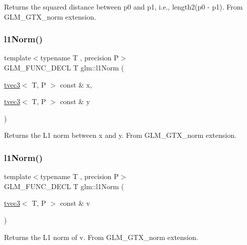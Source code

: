 Returns the squared distance between p0 and p1, i.\+e., length2(p0 -\/ p1). From G\+L\+M\+\_\+\+G\+T\+X\+\_\+norm extension. \mbox{\label{group__gtx__norm_gaebe5a39b06e262e615622129f37da4f4}} 
\subsubsection{\texorpdfstring{l1\+Norm()}{l1Norm()}\hspace{0.1cm}{\footnotesize\ttfamily [1/2]}}
{\footnotesize\ttfamily template$<$typename T , precision P$>$ \\
G\+L\+M\+\_\+\+F\+U\+N\+C\+\_\+\+D\+E\+CL T glm\+::l1\+Norm (\begin{DoxyParamCaption}\item[{\hyperlink{structglm_1_1tvec3}{tvec3}$<$ T, P $>$ const \&}]{x,  }\item[{\hyperlink{structglm_1_1tvec3}{tvec3}$<$ T, P $>$ const \&}]{y }\end{DoxyParamCaption})}

Returns the L1 norm between x and y. From G\+L\+M\+\_\+\+G\+T\+X\+\_\+norm extension. \mbox{\label{group__gtx__norm_ga6d5964f09cdb43803496a5ee3ced71cb}} 
\subsubsection{\texorpdfstring{l1\+Norm()}{l1Norm()}\hspace{0.1cm}{\footnotesize\ttfamily [2/2]}}
{\footnotesize\ttfamily template$<$typename T , precision P$>$ \\
G\+L\+M\+\_\+\+F\+U\+N\+C\+\_\+\+D\+E\+CL T glm\+::l1\+Norm (\begin{DoxyParamCaption}\item[{\hyperlink{structglm_1_1tvec3}{tvec3}$<$ T, P $>$ const \&}]{v }\end{DoxyParamCaption})}

Returns the L1 norm of v. From G\+L\+M\+\_\+\+G\+T\+X\+\_\+norm extension. \mbox{\label{group__gtx__norm_gafa6fbbc99cd44d81bf030e74eaf7ad64}} 
